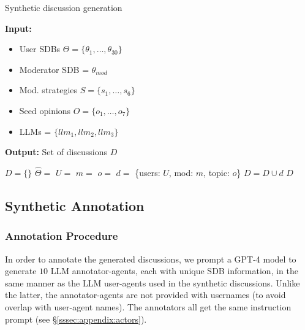 \begin{algorithm}[t]
\caption{Synthetic discussion generation}
\label{alg:exp_generation}
\hspace*{\algorithmicindent} \textbf{Input:} 
         \begin{itemize}[noitemsep, nosep]
             \item User \acsp{SDB} $\Theta = \{\theta_1, \dots, \theta_{30}\}$
             \item Moderator \acs{SDB} = $\theta_{mod}$
             \item Mod. strategies $S = \{s_1, \ldots, s_6\}$
             \item Seed opinions $O = \{o_1, \ldots, o_7\}$
             \item \acp{LLM} = $\{llm_1, llm_2, llm_3\}$
         \end{itemize}
         \hspace*{\algorithmicindent} \textbf{Output:} Set of discussions $D$
\begin{algorithmic}[1]
    \State $D = \{\}$
                \State $\hat{\Theta} = $ 
                \State $U =$  
                \State $m = $ 
                \State $o = $ 
                \State $d =$ \{users: $U$, mod: $m$, topic: $o$\}
                \State $D = D \cup d$
            \EndFor
        \EndFor
    \EndFor
    \State \Return $D$
\end{algorithmic}
\end{algorithm}


\subsection{Synthetic Annotation}
\label{ssec:appendix:annotation}

\subsubsection{Annotation Procedure}

In order to annotate the generated discussions, we prompt a GPT-4 model \cite{openai2024gpt4technicalreport} to generate $10$ \ac{LLM} annotator-agents, each with unique \ac{SDB} information, in the same manner as the \ac{LLM} user-agents used in the synthetic discussions. Unlike the latter, the annotator-agents are not provided with usernames (to avoid overlap with user-agent names). The annotators all get the same instruction prompt (see \S\ref{sssec:appendix:actors}).

